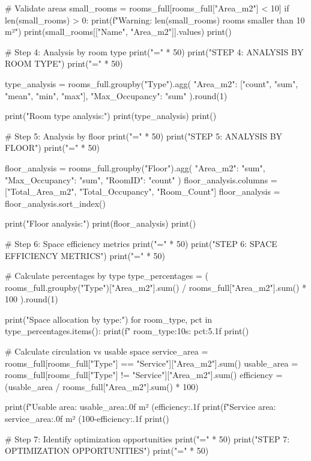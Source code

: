 {    # Validate areas
    small_rooms = rooms_full[rooms_full["Area_m2"] < 10]
    if len(small_rooms) > 0:
        print(f"Warning: {len(small_rooms)} rooms smaller than 10 m²")
        print(small_rooms[["Name", "Area_m2"]].values)
    print()
    
    # Step 4: Analysis by room type
    print("=" * 50)
    print("STEP 4: ANALYSIS BY ROOM TYPE")
    print("=" * 50)
    
    type_analysis = rooms_full.groupby("Type").agg({
        "Area_m2": ["count", "sum", "mean", "min", "max"],
        "Max_Occupancy": "sum"
    }).round(1)
    
    print("Room type analysis:")
    print(type_analysis)
    print()
    
    # Step 5: Analysis by floor
    print("=" * 50)
    print("STEP 5: ANALYSIS BY FLOOR")
    print("=" * 50)
    
    floor_analysis = rooms_full.groupby("Floor").agg({
        "Area_m2": "sum",
        "Max_Occupancy": "sum",
        "RoomID": "count"
    })
    floor_analysis.columns = ["Total_Area_m2", "Total_Occupancy", "Room_Count"]
    floor_analysis = floor_analysis.sort_index()
    
    print("Floor analysis:")
    print(floor_analysis)
    print()
    
    # Step 6: Space efficiency metrics
    print("=" * 50)
    print("STEP 6: SPACE EFFICIENCY METRICS")
    print("=" * 50)
    
    # Calculate percentages by type
    type_percentages = (
        rooms_full.groupby("Type")["Area_m2"].sum() / 
        rooms_full["Area_m2"].sum() * 100
    ).round(1)
    
    print("Space allocation by type:")
    for room_type, pct in type_percentages.items():
        print(f"  {room_type:10s}: {pct:5.1f}%
    print()
    
    # Calculate circulation vs usable space
    service_area = rooms_full[rooms_full["Type"] == "Service"]["Area_m2"].sum()
    usable_area = rooms_full[rooms_full["Type"] != "Service"]["Area_m2"].sum()
    efficiency = (usable_area / rooms_full["Area_m2"].sum() * 100)
    
    print(f"Usable area: {usable_area:.0f} m² ({efficiency:.1f}%
    print(f"Service area: {service_area:.0f} m² ({100-efficiency:.1f}%
    print()
    
    # Step 7: Identify optimization opportunities
    print("=" * 50)
    print("STEP 7: OPTIMIZATION OPPORTUNITIES")
    print("=" * 50)
    
}
